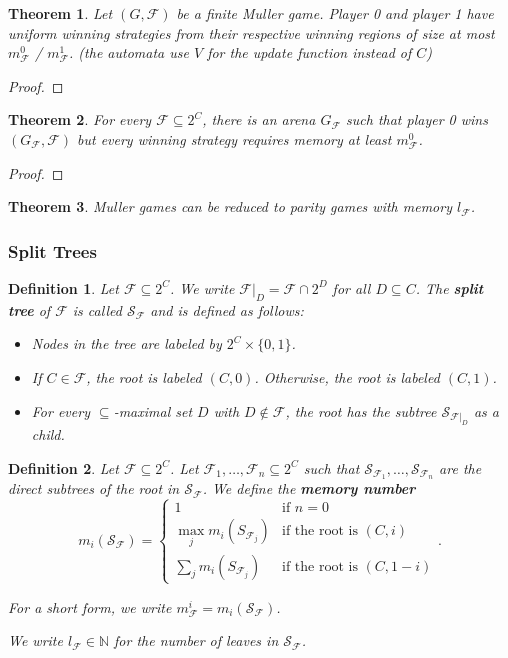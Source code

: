 \documentclass{article}
\newtheorem{theorem}{Theorem}
\newtheorem{definition}{Definition}
\begin{document}
\begin{theorem}
	Let $(G, \mathcal{F})$ be a finite Muller game. Player 0 and player 1 have uniform winning strategies from their respective winning regions of size at most $m^0_\mathcal{F}$ / $m^1_\mathcal{F}$. (the automata use $V$ for the update function instead of $C$)
\end{theorem}
\begin{proof}
\end{proof}

\begin{theorem}
	For every $\mathcal{F} \subseteq 2^C$, there is an arena $G_\mathcal{F}$ such that player 0 wins $(G_\mathcal{F}, \mathcal{F})$ but every winning strategy requires memory at least $m^0_\mathcal{F}$.
\end{theorem}
\begin{proof}
\end{proof}

\begin{theorem}
	Muller games can be reduced to parity games with memory $l_\mathcal{F}$.
\end{theorem}

\subsubsection{Split Trees}
\begin{definition}
	Let $\mathcal{F} \subseteq 2^C$. We write $\mathcal{F}|_D = \mathcal{F} \cap 2^D$ for all $D \subseteq C$. The \textbf{split tree} of $\mathcal{F}$ is called $\mathcal{S}_\mathcal{F}$ and is defined as follows: 
	\begin{itemize}
		\item Nodes in the tree are labeled by $2^C \times \{0,1\}$.
		\item If $C \in \mathcal{F}$, the root is labeled $(C, 0)$. Otherwise, the root is labeled $(C, 1)$.
		\item For every $\subseteq$-maximal set $D$ with $D \notin \mathcal{F}$, the root has the subtree $\mathcal{S}_{\mathcal{F}|_D}$ as a child.
	\end{itemize}
\end{definition}

\begin{definition}
	Let $\mathcal{F} \subseteq 2^C$. Let $\mathcal{F}_1, \dots, \mathcal{F}_n \subseteq 2^C$ such that $\mathcal{S}_{\mathcal{F}_1}, \dots, \mathcal{S}_{\mathcal{F}_n}$ are the direct subtrees of the root in $\mathcal{S}_\mathcal{F}$. We define the \textbf{memory number} 
	$$m_i(\mathcal{S}_\mathcal{F}) = \begin{cases}
		1 & \text{if } n = 0 \\
		\max_j m_i(S_{\mathcal{F}_j}) & \text{if the root is } (C, i) \\
		\sum_j m_i(S_{\mathcal{F}_j}) & \text{if the root is } (C, 1-i) 
	\end{cases}.$$
	
	For a short form, we write $m^i_\mathcal{F} = m_i(\mathcal{S}_\mathcal{F})$.
	
	We write $l_\mathcal{F} \in \mathbb{N}$ for the number of leaves in $\mathcal{S}_\mathcal{F}$.
\end{definition}
\end{document}

